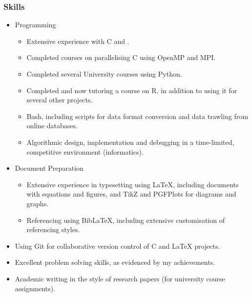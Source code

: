 \documentclass[a4paper,10pt]{article}
\begin{document}
\subsubsection*{Skills}
\begin{itemize}
\item Programming
\begin{itemize}
\item Extensive experience with C and \cpluspluslogo.
\item Completed courses on parallelising C using OpenMP and MPI.
\item Completed several University courses using Python.
\item Completed and now tutoring a course on R, in addition to using it for several other projects.
\item Bash, including scripts for data format conversion and data trawling from online databases.
\item Algorithmic design, implementation and debugging in a time-limited, competitive environment (informatics).
\end{itemize}
\item Document Preparation
\begin{itemize}
\item Extensive experience in typesetting using LaTeX, including documents with equations and figures, and TikZ and PGFPlots for diagrams and graphs.
\item Referencing using BibLaTeX, including extensive customisation of referencing styles.
\end{itemize}
\item Using Git for collaborative version control of C and LaTeX projects.
\item Excellent problem solving skills, as evidenced by my achievements.
\item Academic writing in the style of research papers (for university course assignments).
\end{itemize}
\end{document}
